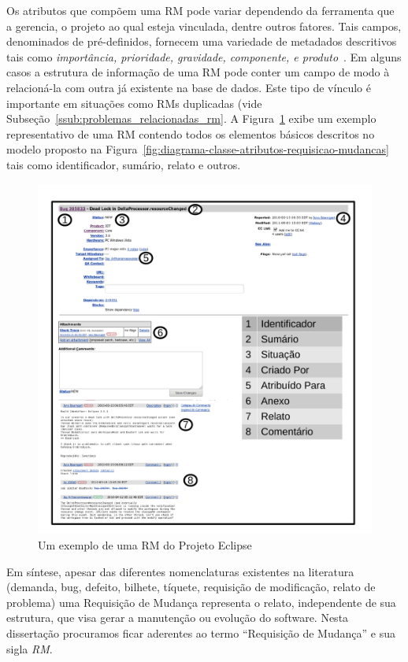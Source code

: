 Os atributos que compõem uma RM pode variar dependendo da ferramenta que a
gerencia, o projeto ao qual esteja vinculada, dentre outros fatores. Tais
campos, denominados de pré-definidos, fornecem uma variedade de metadados
descritivos tais como \textit{importância, prioridade, gravidade, componente, e
	produto}~\cite{zhang2016literature}. Em alguns casos a estrutura de
informação de uma RM pode conter um campo de modo à relacioná-la com outra já
existente na base de dados. Este tipo de vínculo é importante em situações como
RMs duplicadas (vide Subseção~\ref{ssub:problemas_relacionadas_rm}. A
Figura~\ref{fig:rm-exemplo} exibe um exemplo representativo de uma RM contendo
todos os elementos básicos descritos no modelo proposto na
Figura~\ref{fig:diagrama-classe-atributos-requisicao-mudancas} tais como
identificador, sumário, relato e outros.

\begin{figure}[htpb]
	\centering
	\includegraphics[width=0.8\linewidth]{./chapter-manutencao-software-visao-geral/img/rm-exemplo.pdf}
	\caption{Um exemplo de uma RM do Projeto Eclipse}
\label{fig:rm-exemplo}
\end{figure}
\todoend{}

 Em síntese,
apesar das diferentes nomenclaturas existentes na literatura (demanda, bug,
defeito, bilhete, tíquete, requisição de modificação, relato de problema) uma
Requisição de Mudança representa o relato, independente de sua estrutura, que
visa gerar a manutenção ou evolução do software. Nesta dissertação procuramos
ficar aderentes ao termo ``Requisição de Mudança'' e sua sigla \textit{RM}.

